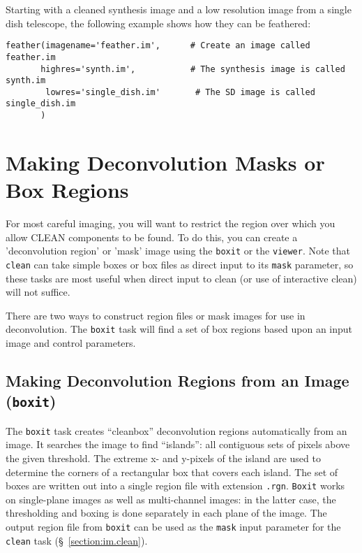 Starting with a cleaned synthesis image and a low resolution image
from a single dish telescope, the following example shows how they
can be feathered:
\small
\begin{verbatim}
feather(imagename='feather.im',      # Create an image called feather.im
       highres='synth.im',           # The synthesis image is called synth.im
        lowres='single_dish.im'       # The SD image is called single_dish.im
       )
\end{verbatim}
\normalsize




\section{Making Deconvolution Masks or Box Regions}
\label{section:im.mask}

For most careful imaging, you will want to restrict the region over
which you allow CLEAN components to be found.  To do this, you can
create a 'deconvolution region' or 'mask' image using the {\tt boxit}
or the {\tt viewer}.
Note that {\tt clean} can take simple boxes
or box files as direct input to its {\tt mask} parameter, so these
tasks are most useful when direct input to clean (or use of
interactive clean) will not suffice.

There are two ways to construct region files or mask images for use
in deconvolution.  The {\tt boxit} task will find a set of box regions
based upon an input image and control parameters.  

\subsection{Making Deconvolution Regions from an Image ({\tt boxit})}
\label{section:im.mask.boxit}

The {\tt boxit} task creates ``cleanbox'' deconvolution regions automatically
from an image.  It searches the image to find ``islands'': all contiguous
sets of pixels above the given threshold.  The extreme x- and y-pixels of the
island are used to determine the corners of a rectangular box that covers each
island.  The set of boxes are written out into a single region file with
extension {\tt .rgn}.  {\tt Boxit} works on single-plane images as well as
multi-channel images: in the latter case, the thresholding and boxing is done
separately in each plane of the image.  The output region file from {\tt boxit}
can be used as the {\tt mask} input parameter for the {\tt clean} task
(\S~\ref{section:im.clean}).


